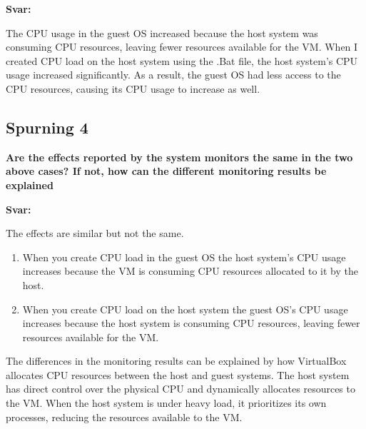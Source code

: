 \documentclass{article}
\newcommand{\sv}{\textbf{Svar:}}
\newcommand{\bo}[1]{\textbf{#1}}
\begin{document}
\sv


The CPU usage in the guest OS increased because the host system was consuming CPU resources, leaving fewer resources available for the VM. 
When I created CPU load on the host system using the .Bat file, the host system's CPU usage increased significantly. 
As a result, the guest OS had less access to the CPU resources, causing its CPU usage to increase as well.


\subsection{Spurning 4}
\bo{Are the effects reported by the system monitors the same in the two above cases? If not, 
how can the different monitoring results be explained}

\sv


The effects are similar but not the same.
\begin{enumerate}
    \item When you create CPU load in the guest OS the host system's CPU usage 
    increases because the VM is consuming CPU resources allocated to it by the host.

    \item When you create CPU load on the host system the guest OS's CPU usage 
    increases because the host system is consuming CPU resources, 
    leaving fewer resources available for the VM.
\end{enumerate}

The differences in the monitoring results can be explained by how 
VirtualBox allocates CPU resources between the host and guest systems. 
The host system has direct control over the physical CPU and dynamically 
allocates resources to the VM. When the host system is under heavy load, 
it prioritizes its own processes, reducing the resources available to the VM.
\end{document}
